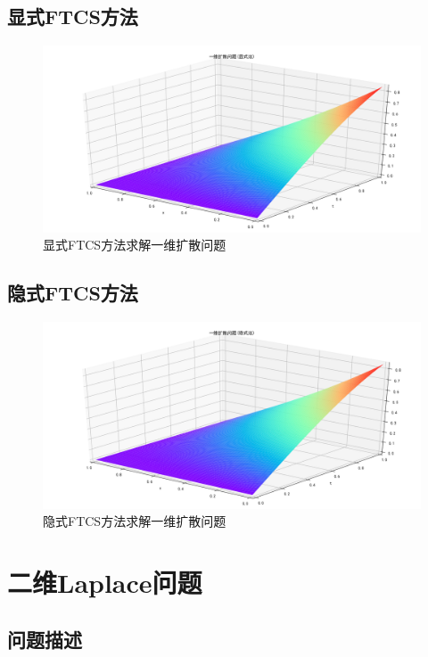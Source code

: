 \documentclass[11pt]{ctexart}
\begin{document}
\subsection{显式FTCS方法}

\begin{figure}[ht] %
\centering
\includegraphics[width=0.8\linewidth]{Pyfingure/Figure_1_1.png} 
\caption{显式FTCS方法求解一维扩散问题}
\end{figure}

\subsection{隐式FTCS方法}

\begin{figure}[ht]
\centering
\includegraphics[width=0.8\linewidth]{Pyfingure/Figure_1_2.png} 
\caption{隐式FTCS方法求解一维扩散问题}
\end{figure}

\section{二维Laplace问题}

\subsection{问题描述}
\end{document}
